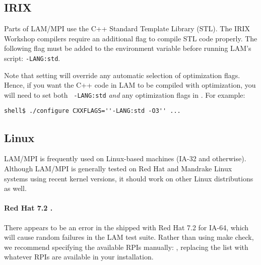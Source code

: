 
\subsection{IRIX}

Parts of LAM/MPI use the C++ Standard Template Library (STL).  The
IRIX Workshop compilers require an additional flag to compile STL code
properly.  The following flag must be added to the 
environment variable before running LAM's  script:
{\tt -LANG:std}.

Note that setting  will override any automatic
selection of optimization flags.  Hence, if you want the C++ code in
LAM to be compiled with optimization, you will need to set both {\tt
  -LANG:std} {\em and} any optimization flags in .
For example:

\lstset{style=lam-cmdline}
\begin{lstlisting}
shell$ ./configure CXXFLAGS=''-LANG:std -O3'' ...
\end{lstlisting}



\subsection{Linux}


LAM/MPI is frequently used on Linux-based machines (IA-32 and
otherwise).  Although LAM/MPI is generally tested on Red Hat and
Mandrake Linux systems using recent kernel versions, it should work on
other Linux distributions as well.

\paragraph{Red Hat 7.2 .}


There appears to be an error in the  shipped with Red Hat 7.2
for IA-64, which will cause random failures in the LAM test suite.
Rather than using make check, we recommend specifying the available
RPIs manually: , replacing
the list with whatever RPIs are available in your installation.


